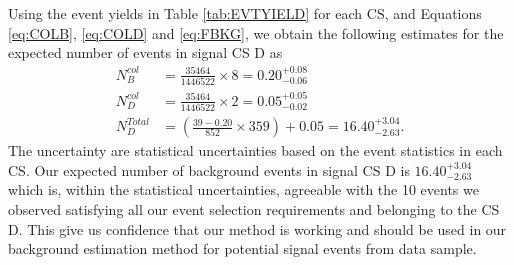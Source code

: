 \vspace{5mm}
Using the event yields in Table \ref{tab:EVTYIELD} for each CS, and Equations \ref{eq:COLB}, \ref{eq:COLD} and \ref{eq:FBKG}, we obtain the following estimates for the expected number of events in signal CS \textsf{D} as
\begin{align*} 
 N_{B}^{col} &= \frac{35464}{1446522} \times 8 = 0.20^{+0.08}_{-0.06} \\
 N_{D}^{col} &= \frac{35464}{1446522} \times 2 = 0.05^{+0.05}_{-0.02} \\
 N_{D}^{Total} &= \left( \frac{39 - 0.20}{852}\times 359\right) +  0.05 = 16.40^{+3.04}_{-2.63}.
\end{align*}
The uncertainty are statistical uncertainties based on the event statistics in each CS. Our expected number of background events in signal CS \textsf{D} is $16.40^{+3.04}_{-2.63}$  which is, within the statistical uncertainties, agreeable with the 10 events we observed satisfying all our event selection requirements and belonging to the CS \textsf{D}. 
This give us confidence that our method is working and should be used in our background estimation method for potential signal events from data sample.
